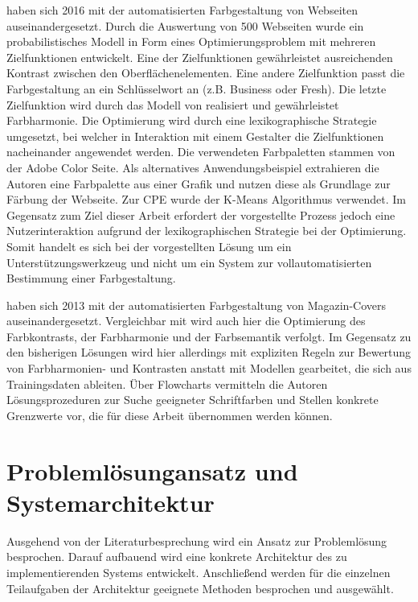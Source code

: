 \documentclass[11pt,a4paper,bibliography=totoc,twocolumn]{scrartcl}
\begin{document}
\citet{webpage} haben sich 2016 mit der automatisierten Farbgestaltung von Webseiten auseinandergesetzt. Durch die Auswertung von 500 Webseiten wurde ein probabilistisches Modell in Form eines Optimierungsproblem mit mehreren Zielfunktionen entwickelt. Eine der Zielfunktionen gewährleistet ausreichenden Kontrast zwischen den Oberflächenelementen. Eine andere Zielfunktion passt die Farbgestaltung an ein Schlüsselwort an (z.B. \glqq{}Business\grqq{} oder \glqq{}Fresh\grqq{}). Die letzte Zielfunktion wird durch das Modell von \citet{colorcomp} realisiert und gewährleistet Farbharmonie. Die Optimierung wird durch eine lexikographische Strategie umgesetzt, bei welcher in Interaktion mit einem Gestalter die Zielfunktionen nacheinander angewendet werden. Die verwendeten Farbpaletten stammen von der Adobe Color Seite. Als alternatives Anwendungsbeispiel extrahieren die Autoren eine Farbpalette aus einer Grafik und nutzen diese als Grundlage zur Färbung der Webseite. Zur CPE wurde der K-Means Algorithmus verwendet. Im Gegensatz zum Ziel dieser Arbeit erfordert der vorgestellte Prozess jedoch eine Nutzerinteraktion aufgrund der lexikographischen Strategie bei der Optimierung. Somit handelt es sich bei der vorgestellten Lösung um ein Unterstützungswerkzeug und nicht um ein System zur vollautomatisierten Bestimmung einer Farbgestaltung.

\citet{magazines}  haben sich 2013 mit der automatisierten Farbgestaltung von Magazin-Covers auseinandergesetzt. Vergleichbar mit \citep{webpage} wird auch hier die Optimierung des Farbkontrasts, der Farbharmonie und der Farbsemantik verfolgt.  Im Gegensatz zu den bisherigen Lösungen wird hier allerdings mit expliziten Regeln zur Bewertung von Farbharmonien- \citep{itten} und Kontrasten anstatt mit Modellen gearbeitet, die sich aus Trainingsdaten ableiten. Über Flowcharts vermitteln die Autoren Lösungsprozeduren zur Suche geeigneter Schriftfarben und Stellen konkrete Grenzwerte vor, die für diese Arbeit übernommen werden können.

\section{Problemlösungansatz und Systemarchitektur}

Ausgehend von der Literaturbesprechung wird ein Ansatz zur Problemlösung besprochen. Darauf aufbauend wird eine konkrete Architektur des zu implementierenden Systems entwickelt. Anschließend werden für die einzelnen Teilaufgaben der Architektur geeignete Methoden besprochen und ausgewählt.
\end{document}
